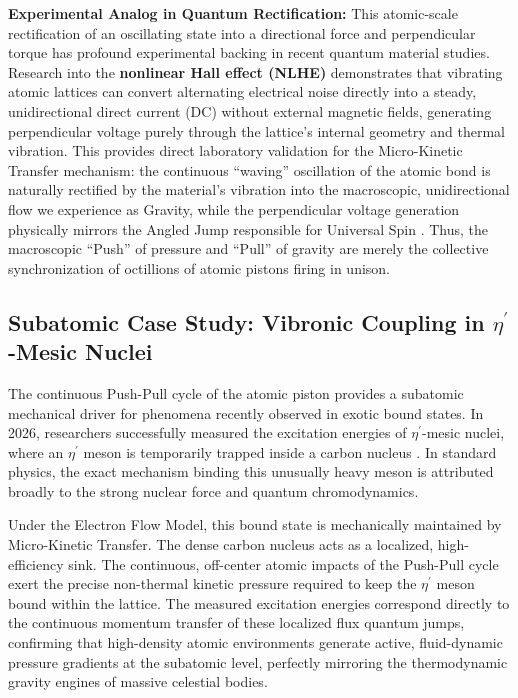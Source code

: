 \documentclass[11pt, a4paper]{article}
\begin{document}
\textbf{Experimental Analog in Quantum Rectification:} This atomic-scale rectification of an oscillating state into a directional force and perpendicular torque has profound experimental backing in recent quantum material studies. Research into the \textbf{nonlinear Hall effect (NLHE)} demonstrates that vibrating atomic lattices can convert alternating electrical noise directly into a steady, unidirectional direct current (DC) without external magnetic fields, generating perpendicular voltage purely through the lattice's internal geometry and thermal vibration. This provides direct laboratory validation for the Micro-Kinetic Transfer mechanism: the continuous ``waving'' oscillation of the atomic bond is naturally rectified by the material's vibration into the macroscopic, unidirectional flow we experience as Gravity, while the perpendicular voltage generation physically mirrors the Angled Jump responsible for Universal Spin \cite{sodemann2015}. Thus, the macroscopic ``Push'' of pressure and ``Pull'' of gravity are merely the collective synchronization of octillions of atomic pistons firing in unison.

\subsection{Subatomic Case Study: Vibronic Coupling in \texorpdfstring{$\eta^{\prime}$}{eta'}-Mesic Nuclei}
  The continuous Push-Pull cycle of the atomic piston provides a subatomic mechanical driver for phenomena recently observed in exotic bound states. In 2026, researchers successfully measured the excitation energies of $\eta^{\prime}$-mesic nuclei, where an $\eta^{\prime}$ meson is temporarily trapped inside a carbon nucleus \cite{mesic2026}. In standard physics, the exact mechanism binding this unusually heavy meson is attributed broadly to the strong nuclear force and quantum chromodynamics.

  Under the Electron Flow Model, this bound state is mechanically maintained by Micro-Kinetic Transfer. The dense carbon nucleus acts as a localized, high-efficiency sink. The continuous, off-center atomic impacts of the Push-Pull cycle exert the precise non-thermal kinetic pressure required to keep the $\eta^{\prime}$ meson bound within the lattice. The measured excitation energies correspond directly to the continuous momentum transfer of these localized flux quantum jumps, confirming that high-density atomic environments generate active, fluid-dynamic pressure gradients at the subatomic level, perfectly mirroring the thermodynamic gravity engines of massive celestial bodies.
\end{document}
